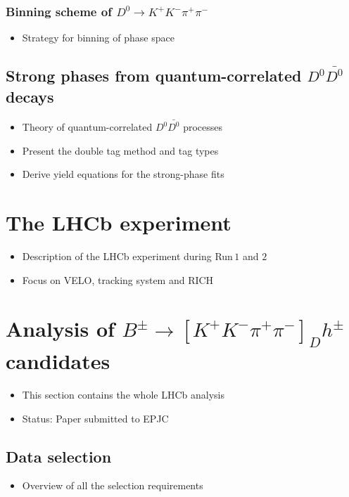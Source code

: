 \documentclass[12pt, a4paper, notitlepage, onecolumn]{article}
\begin{document}
\subsubsection{Binning scheme of \texorpdfstring{$D^0\to K^+K^-\pi^+\pi^-$}{D02KKpipi}}
  \begin{itemize}[nosep]
    \setlength{\itemindent}{2.5em}
    \item[\textasteriskcentered]{Strategy for binning of phase space}
  \end{itemize}
\subsection{Strong phases from quantum-correlated \texorpdfstring{$D^0\bar{D^0}$}{D0D0bar} decays}
  \begin{itemize}[nosep]
    \setlength{\itemindent}{2em}
    \item[\textendash]{Theory of quantum-correlated $D^0\bar{D^0}$ processes}
    \item[\textendash]{Present the double tag method and tag types}
    \item[\textendash]{Derive yield equations for the strong-phase fits}
  \end{itemize}

\section{The LHCb experiment}
  \begin{itemize}[nosep]
    \setlength{\itemindent}{0em}
    \item{Description of the LHCb experiment during Run\,$1$ and $2$}
    \item{Focus on VELO, tracking system and RICH}
  \end{itemize}

\section{Analysis of \texorpdfstring{$B^\pm\to[K^+K^-\pi^+\pi^-]_Dh^\pm$}{B2DhD2KKpipi} candidates}
  \begin{itemize}[nosep]
    \setlength{\itemindent}{0em}
    \item{This section contains the whole LHCb analysis}
    \item{Status: Paper submitted to EPJC}
  \end{itemize}
\subsection{Data selection}
  \begin{itemize}[nosep]
    \setlength{\itemindent}{2em}
    \item[\textendash]{Overview of all the selection requirements}
  \end{itemize}
\end{document}
